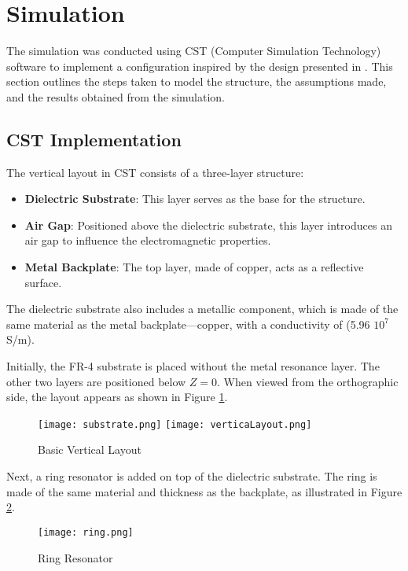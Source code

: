\section{\textsf{Simulation}} 
    The simulation was conducted using CST (Computer Simulation Technology)
    software to implement a configuration inspired by the design presented 
    in \cite{zhang_design_2023}. This section outlines the steps taken to 
    model the structure, the assumptions made, and the results obtained from
    the simulation.

    \subsection{\textsf{CST Implementation}} 
        The vertical layout in CST consists of a three-layer structure:
        \begin{itemize}
        \item \textbf{Dielectric Substrate}:  This layer serves as the 
            base for the structure.
        \item \textbf{Air Gap}: Positioned above the dielectric substrate,
            this layer introduces an air gap to influence the electromagnetic 
            properties.
        \item \textbf{Metal Backplate}: The top layer, made of copper, 
            acts as a reflective surface.
        \end{itemize}

        The dielectric substrate also includes a metallic component, which
        is made of the same material as the metal backplate—copper, with
        a conductivity of (5.96 \mu $10^7$ S/m).

        Initially, the FR-4 substrate is placed without the metal 
        resonance layer. The other two layers are positioned below $Z=0$. 
        When viewed from the orthographic side, the layout appears as shown
        in Figure \ref{img:layout}.
        \begin{figure}[h]
            \centering
            \texttt{[image: substrate.png]}\hfil
            \texttt{[image: verticaLayout.png]}
            \caption{Basic Vertical Layout}
            \label{img:layout}
        \end{figure}

        Next, a ring resonator is added on top of the dielectric substrate. 
        The ring is made of the same material and thickness as the backplate, 
        as illustrated in Figure \ref{img:ring}.
        \begin{figure}[h]
            \centering
            \texttt{[image: ring.png]}
            \caption{Ring Resonator}
            \label{img:ring}
        \end{figure}

